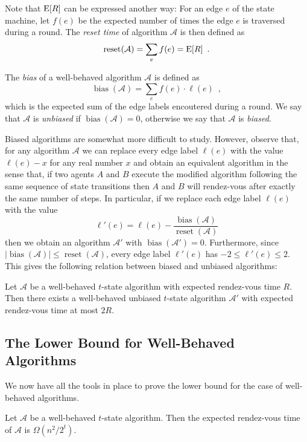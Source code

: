 \documentclass[acmtoalg]{acmtrans2m}
\newcommand{\A}{\mathcal{A}}
\DeclareMathOperator{\bias}{bias}
\DeclareMathOperator{\reset}{reset}
\begin{document}
Note that $\mathrm{E}[R]$ can be expressed another way: For an edge $e$ of the
state machine, let $f(e)$ be the expected number of times the edge $e$
is traversed during a round.  The
\emph{reset time} of algorithm $\A$ is then defined as
\[
   \reset(\A) = \sum_e f(e) = \E[R] \enspace .
\]

The \emph{bias} of a well-behaved algorithm $\A$ is defined as
\[
    \bias(\A) = \sum_{e} f(e)\cdot\ell(e) \enspace ,
\]
which is the expected sum of the edge labels encoutered during a round.
We say that $\A$ is \emph{unbiased} if $\bias(\A)=0$, otherwise we say
that $\A$ is \emph{biased}.

Biased algorithms are somewhat more difficult to study.  However,
observe that, for any algorithm $\mathcal{A}$ we can replace every
edge label $\ell(e)$ with the value $\ell(e)-x$ for any real number
$x$ and obtain an equivalent algorithm in the sense that, if two
agents $A$ and $B$ execute the modified algorithm following the same
sequence of state transitions then $A$ and $B$ will rendez-vous after
exactly the same number of steps.  In particular, if we replace each
edge label $\ell(e)$ with the value
\[
   \ell'(e) = \ell(e) - \frac{\bias(\A)}{\reset(\A)}
\]
then we obtain an algorithm $\A'$ with $\bias(\A')=0$.  Furthermore, since
$|\bias(\A)|\le\reset(\A)$, every edge label $\ell'(e)$ has
$-2 \le \ell'(e)\le 2$.  This gives the following relation between
biased and unbiased algorithms:

\begin{lem}
Let $\A$ be a well-behaved $t$-state algorithm with expected rendez-vous time
$R$.  Then there exists a well-behaved unbiased $t$-state algorithm $\A'$ with
expected rendez-vous time at most $2R$.
\end{lem}

\subsection{The Lower Bound for Well-Behaved Algorithms}

We now have all the tools in place to prove the lower bound for the
case of well-behaved algorithms.

\begin{lem}
Let $\A$ be a well-behaved $t$-state algorithm.  Then the expected rendez-vous
time of $\A$ is $\Omega(n^2/2^{t})$.
\end{lem}
\end{document}
